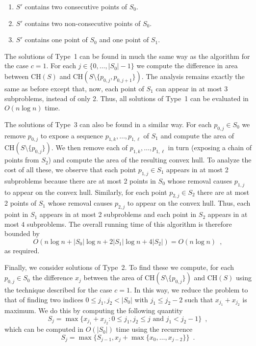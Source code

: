 \documentclass[lotsofwhite]{patmorin}
\newcommand{\ch}{\mathrm{CH}}
\begin{document}
\begin{enumerate}
\item $S'$ contains two consecutive points of $S_0$.
\item $S'$ contains two non-consecutive points of $S_0$.
\item $S'$ contains one point of $S_0$ and one point of $S_1$.
\end{enumerate}

The solutions of Type~1 can be found in much the same way as the
algorithm for the case $c=1$.  For each $j\in\{0,\ldots,|S_0|-1\}$ we
compute the difference in area between $\ch(S)$ and
$\ch(S\setminus\{p_{0,j},p_{0,j+1}\})$.  The analysis remains exactly
the same as before except that, now, each point of $S_1$ can appear in
at most $3$ subproblems, instead of only 2.  Thus, all solutions of
Type~1 can be evaluated in $O(n\log n)$ time.


The solutions of Type~3 can also be found in a similar way.  For each
$p_{0,j}\in S_0$ we remove $p_{0,j}$ to expose a sequence
$p_{1,k},\ldots,p_{1,\ell}$ of $S_1$ and compute the area of
$\ch(S\setminus\{p_{0,j}\})$.  We then remove each of
$p_{1,k},\ldots,p_{1,\ell}$ in turn (exposing a chain of points from
$S_2$) and compute the area of the resulting convex hull.  To analyze
the cost of all these, we observe that each point $p_{1,j}\in S_1$
appears in at most 2 subproblems because there are at most 2 points in
$S_0$ whose removal causes $p_{1,j}$ to appear on the convex hull.
Similarly, for each point $p_{2,j}\in S_2$ there are at most 2 points
of $S_1$ whose removal causes $p_{2,j}$ to appear on the convex hull.
Thus, each point in $S_1$ appears in at most 2 subproblems and each
point in $S_2$ appears in at most $4$ subproblems.  The overall
running time of this algorithm is therefore bounded by
\[
    O\left(n\log n + |S_0|\log n + 2|S_1|\log n + 4|S_2|\right) = O(n\log n) \enspace ,
\]
as required.

Finally, we consider solutions of Type~2.  To find these we compute,
for each $p_{0,j}\in S_0$ the difference $x_j$ between the area of
$\ch(S\setminus\{p_{0,j}\})$ and $\ch(S)$ using the technique
described for the case $c=1$.  In this way, we reduce the problem to
that of finding two indices $0\le j_1,j_2< |S_0|$ with $j_1\le j_2-2$ such that
$x_{j_1}+x_{j_2}$ is maximum.  We do this 
by computing the following quantity 
\[
     S_j = \max\{x_{j_1}+x_{j_2} : 
       \mbox{$0\le j_1,j_2\le j$ and $j_1 < j_2-1$}\} \enspace ,
\]
which can be computed in $O(|S_0|)$ time using the recurrence
\[
    S_j = \max\{S_{j-1}, x_{j} + \max\{x_{0},\ldots,x_{j-2}\}\}
                \enspace .
\]
\end{document}
